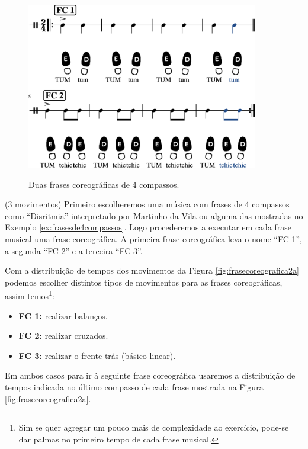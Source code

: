 \begin{figure}[!h]
    \centering
    \href{https://drive.google.com/file/d/11rRCjadkiARMnrgTAQUq3A0s6xMLi5B4/view?usp=sharing}{\includegraphics[width=0.9\textwidth]{chapters/cap-musicalidade/treino-fraseio1a-1.eps}}
    \caption{Duas frases coreográficas de 4 compassos.}
    \label{fig:frasecoreografica1a}
\end{figure}


\begin{example}(3 movimentos)
Primeiro escolheremos uma música com frases de 4 compassos 
como ``Disritmia'' interpretado por Martinho da Vila 
ou alguma das mostradas no Exemplo \ref{ex:frasesde4compassos}.
Logo procederemos a executar em cada frase musical uma frase coreográfica.
A primeira frase coreográfica leva o nome ``FC 1'', 
a segunda ``FC 2''  e a terceira ``FC 3''.


Com a distribuição de tempos dos movimentos da Figura \ref{fig:frasecoreografica2a}  
podemos escolher distintos tipos de movimentos para as frases coreográficas, 
assim temos\footnote{Sim 
se quer agregar um pouco mais de complexidade ao exercício,
pode-se dar palmas no primeiro tempo de cada frase musical.}:
\begin{itemize}
\item \textbf{FC 1:} realizar balanços.
\item \textbf{FC 2:} realizar cruzados.
\item \textbf{FC 3:} realizar o frente trás (básico linear).
\end{itemize}
Em ambos casos para ir à seguinte frase coreográfica usaremos a distribuição de tempos indicada no último compasso 
de cada frase mostrada na Figura \ref{fig:frasecoreografica2a}.
\end{example}

